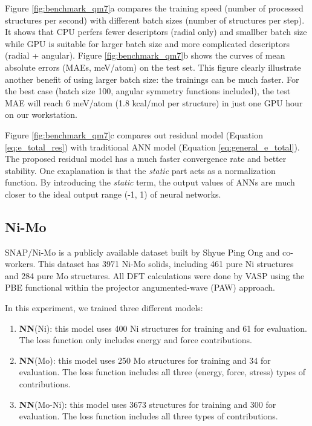 \documentclass[final,1p,times]{elsarticle}
\begin{document}
Figure \ref{fig:benchmark_qm7}a compares the training speed (number of processed 
structures per second) with different batch sizes (number of structures per 
step). It shows that CPU perfers fewer descriptors (radial only) and smallber 
batch size while GPU is suitable for larger batch size and more complicated 
descriptors (radial + angular). 
Figure \ref{fig:benchmark_qm7}b shows the curves of mean absolute errors 
(MAEs, meV/atom) on the test set. This figure clearly illustrate another benefit 
of using larger batch size: the trainings can be much faster. For the best case 
(batch size 100, angular symmetry functions included), the test MAE will reach 6 
meV/atom (1.8 kcal/mol per structure) in just one GPU hour on our workstation.

Figure \ref{fig:benchmark_qm7}c compares out residual model (Equation 
\ref{eq:e_total_res}) with traditional ANN model (Equation 
\ref{eq:general_e_total}). The proposed residual model has a much faster 
convergence rate and better stability. One exaplanation is that the 
\textit{static} part acts as a normalization function. By introducing the 
\textit{static} term, the output values of ANNs are much closer to the ideal 
output range (-1, 1) of neural networks.

% 
%
\subsection{Ni-Mo}

SNAP/Ni-Mo\cite{SNAP_Mo_2017, SNAP_2018} is a publicly available dataset built 
by Shyue Ping Ong and co-workers. This dataset has 3971 Ni-Mo solids, including 
461 pure Ni structures and 284 pure Mo structures. All DFT calculations were 
done by VASP\cite{VASP} using the PBE\cite{PBE} functional within the projector 
angumented-wave (PAW)\cite{PAW} approach.

In this experiment, we trained three different models:
\begin{enumerate}
    
    \item \textbf{NN}(Ni): this model uses 400 Ni structures for training and 61 
    for evaluation. The loss function only includes energy and force 
    contributions.
    
    \item \textbf{NN}(Mo): this model uses 250 Mo structures for training and 34 
    for evaluation. The loss function includes all three (energy, force, stress) 
    types of contributions. 
    
    \item \textbf{NN}(Mo-Ni): this model uses 3673 structures for training and 
    300 for evaluation. The loss function includes all three types of 
    contributions.

\end{enumerate}
\end{document}
